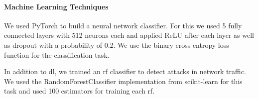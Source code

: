 \documentclass[10pt,sigconf,letterpaper,dvipsnames]{acmart}
\begin{document}

\paragraph{Machine Learning Techniques}
We used PyTorch to build a neural network classifier. For this we used 5 fully connected layers with 512 neurons each and applied ReLU after each layer as well as dropout with a probability of 0.2. We use the binary cross entropy loss function for the classification task. %

In addition to \gls{dl}, we trained an \gls{rf} classifier to detect attacks in network traffic. We used the RandomForestClassifier implementation from scikit-learn for this task and used 100 estimators for training each \gls{rf}.
\end{document}
